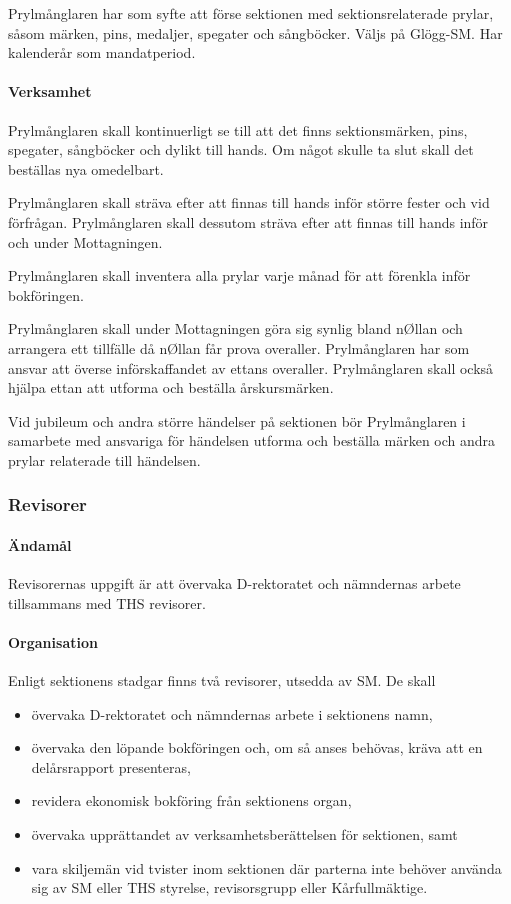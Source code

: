 \documentclass[a4paper,12pt]{article}
\begin{document}
Prylmånglaren har som syfte att förse sektionen med sektionsrelaterade prylar, såsom märken, pins, medaljer, spegater och sångböcker. Väljs på Glögg-SM. Har kalenderår som mandatperiod.

\paragraph{Verksamhet}

Prylmånglaren skall kontinuerligt se till att det finns sektionsmärken, pins, spegater, sångböcker och dylikt till hands. Om något skulle ta slut skall det beställas nya omedelbart.

Prylmånglaren skall sträva efter att finnas till hands inför större fester och vid förfrågan. Prylmånglaren skall dessutom sträva efter att finnas till hands inför och under Mottagningen.

Prylmånglaren skall inventera alla prylar varje månad för att förenkla inför bokföringen.

Prylmånglaren skall under Mottagningen göra sig synlig bland nØllan och arrangera ett tillfälle då nØllan får prova overaller. Prylmånglaren har som ansvar att överse införskaffandet av ettans overaller. Prylmånglaren skall också hjälpa ettan att utforma och beställa årskursmärken.

Vid jubileum och andra större händelser på sektionen bör Prylmånglaren i samarbete med ansvariga för händelsen utforma och beställa märken och andra prylar relaterade till händelsen.

\subsubsection{Revisorer}

\paragraph{Ändamål}

Revisorernas uppgift är att övervaka D-rektoratet och nämndernas arbete tillsammans med THS revisorer.

\paragraph{Organisation}

Enligt sektionens stadgar finns två revisorer, utsedda av SM. De skall

\begin{itemize}
  \item övervaka D-rektoratet och nämndernas arbete i sektionens namn,
  \item övervaka den löpande bokföringen och, om så anses behövas, kräva att en delårsrapport presenteras,
  \item revidera ekonomisk bokföring från sektionens organ,
  \item övervaka upprättandet av verksamhetsberättelsen för sektionen, samt
  \item vara skiljemän vid tvister inom sektionen där parterna inte behöver använda sig av SM eller THS styrelse, revisorsgrupp eller Kårfullmäktige.
\end{itemize}
\end{document}

